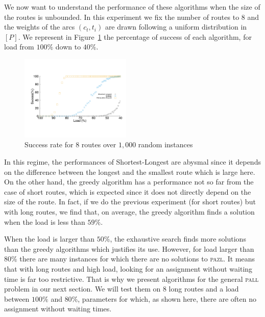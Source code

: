 \documentclass[a4paper,10pt]{article}
\newcommand\pazl{\textsc{pazl}\xspace}
\newcommand\pall{\textsc{pall}\xspace}
\begin{document}
      We now want to understand the performance of these algorithms when the size of the routes is unbounded. In this experiment we fix the number of routes to $8$ and the weights of the arcs $(c_t,t_i)$ are drawn following a uniform distribution in $[P]$. We represent in Figure~\ref{fig:long} the percentage of success of each algorithm, for load from $100\%$ down to $40\%$.
      
\begin{figure}[h]

       \begin{center}
      \includegraphics[width=0.47\textwidth]{echec_longues.pdf}
      \end{center}
       
      \caption{Success rate for $8$ routes over $1,000$ random instances}\label{fig:long}
     \end{figure}
      
      In this regime, the performances of Shortest-Longest are abysmal since it depends on the difference between the longest and the smallest route which is large here. On the other hand, the greedy algorithm has a performance not so far from the case of short routes, which is expected since it does not directly depend on the size of the route. In fact, if we do the previous experiment  (for short routes) but with long routes, we find that, on average, the greedy algorithm finds a solution when the load is less than $59\%$.
      
      When the load is larger than $50\%$, the exhaustive search finds more solutions than the greedy algorithms which justifies its use. However, for load larger than $80\%$ there are many instances for which there are no solutions to \pazl.
      It means that with long routes and high load, looking for an assignment without waiting time is far too restrictive. That is why we present algorithms for the general \pall problem in our next section. We will test them on $8$ long routes and a load between $100\%$ and $80\%$, parameters for which, as shown here, there are often no assignment without waiting times.
      
\end{document}
